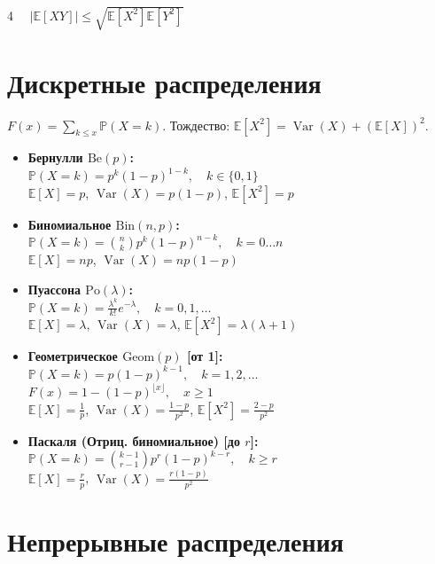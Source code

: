 \documentclass[a4paper, landscape]{article}
\newcommand{\E}{\mathbb{E}}
\renewcommand{\P}{\mathbb{P}}
\DeclareMathOperator{\Var}{Var}
\begin{document}
\begin{multicols*}{4}
     $\quad |\E[XY]| \le \sqrt{\E[X^2]\E[Y^2]}$

\section*{Дискретные распределения}
$F(x) = \sum_{k \le x} \P(X=k)$. Тождество: $\E[X^2] = \Var(X) + (\E[X])^2$.

\begin{itemize}[leftmargin=*, nosep, itemsep=4pt]
    \item \textbf{Бернулли $\text{Be}(p)$:} \\
    $\P(X=k) = p^k (1-p)^{1-k}, \quad k \in \{0, 1\}$ \\
    $\E[X] = p$, \quad $\Var(X) = p(1-p)$, \quad $\E[X^2] = p$

    \item \textbf{Биномиальное $\text{Bin}(n, p)$:} \\
    $\P(X=k) = \binom{n}{k} p^k (1-p)^{n-k}, \quad k = 0 \dots n$ \\
    $\E[X] = np$, \quad $\Var(X) = np(1-p)$

    \item \textbf{Пуассона $\text{Po}(\lambda)$:} \\
    $\P(X=k) = \frac{\lambda^k}{k!} e^{-\lambda}, \quad k = 0, 1, \dots$ \\
    $\E[X] = \lambda$, \quad $\Var(X) = \lambda$, \quad $\E[X^2] = \lambda(\lambda+1)$

    \item \textbf{Геометрическое $\text{Geom}(p)$ [от 1]:} \\
    $\P(X=k) = p(1-p)^{k-1}, \quad k = 1, 2, \dots$ \\
    $F(x) = 1 - (1-p)^{\lfloor x \rfloor}, \quad x \ge 1$ \\
    $\E[X] = \frac{1}{p}$, \quad $\Var(X) = \frac{1-p}{p^2}$, \quad $\E[X^2] = \frac{2-p}{p^2}$

    \item \textbf{Паскаля (Отриц. биномиальное) [до $r$]:} \\
    $\P(X=k) = \binom{k-1}{r-1} p^r (1-p)^{k-r}, \quad k \ge r$ \\
    $\E[X] = \frac{r}{p}$, \quad $\Var(X) = \frac{r(1-p)}{p^2}$
\end{itemize}

\section*{Непрерывные распределения}


\end{multicols*}
\end{document}
